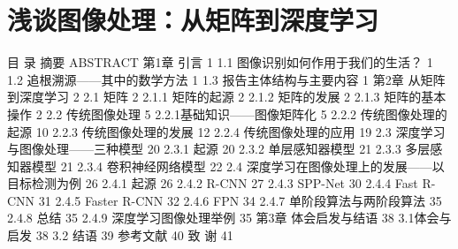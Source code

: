 

\section{浅谈图像处理：从矩阵到深度学习}

目  录
摘要
ABSTRACT
第1章  引言	1
1.1 图像识别如何作用于我们的生活？	1
1.2 追根溯源——其中的数学方法	1
1.3 报告主体结构与主要内容	1
第2章  从矩阵到深度学习	2
2.1 矩阵	2
2.1.1 矩阵的起源	2
2.1.2 矩阵的发展	2
2.1.3 矩阵的基本操作	2
2.2 传统图像处理	5
2.2.1基础知识——图像矩阵化	5
2.2.2 传统图像处理的起源	10
2.2.3 传统图像处理的发展	12
2.2.4 传统图像处理的应用	19
2.3 深度学习与图像处理——三种模型	20
2.3.1 起源	20
2.3.2 单层感知器模型	21
2.3.3 多层感知器模型	21
2.3.4 卷积神经网络模型	22
2.4 深度学习在图像处理上的发展——以目标检测为例	26
2.4.1 起源	26
2.4.2 R-CNN	27
2.4.3 SPP-Net	30
2.4.4 Fast R-CNN	31
2.4.5 Faster R-CNN	32
2.4.6 FPN	34
2.4.7 单阶段算法与两阶段算法	35
2.4.8 总结	35
2.4.9 深度学习图像处理举例	35
第3章  体会启发与结语	38
3.1体会与启发	38
3.2 结语	39
参考文献	40
致  谢	41

